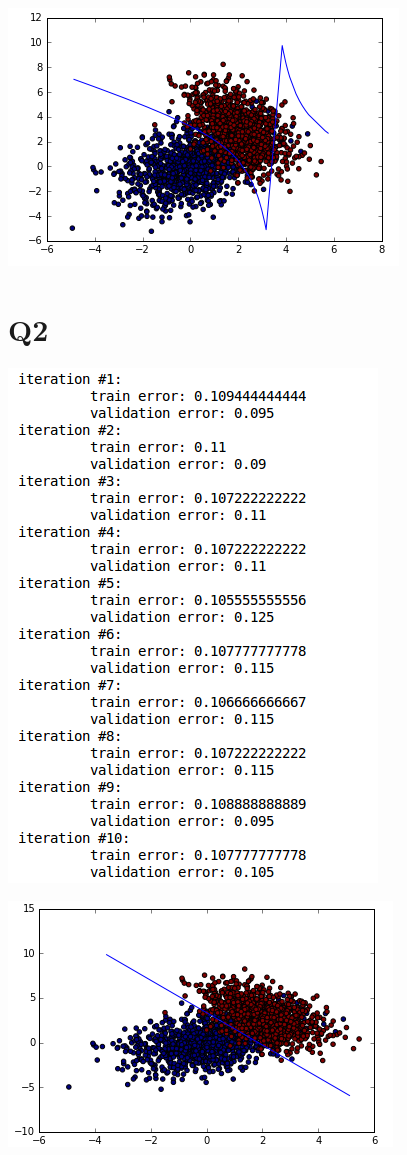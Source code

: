 \documentclass[11]{article}
\begin{document}
 \includegraphics[scale=1]{fig3.png}
\section*{Q2}


 \includegraphics[scale=1]{fig4.png}
 
 \includegraphics[scale=1]{fig5.png}
\end{document}
